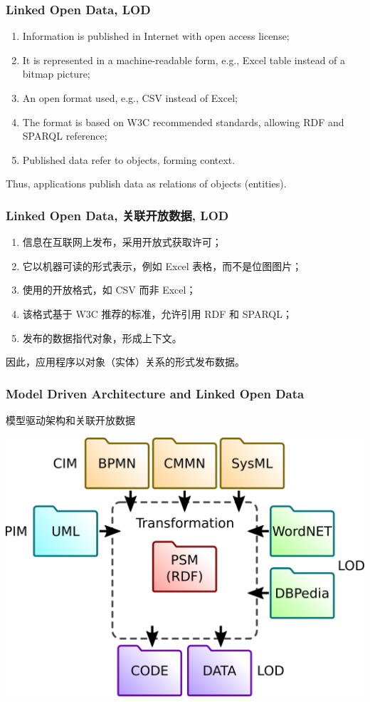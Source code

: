 \documentclass[10pt]{beamer}
\begin{document}
\begin{frame}
  \frametitle{Linked Open Data, LOD}
  \begin{enumerate}
  \item Information is published in Internet with open access license;
  \item It is represented in a machine-readable form, e.g., Excel table instead of a bitmap picture;
  \item An open format used, e.g., CSV instead of Excel;
  \item The format is based on W3C recommended standards, allowing RDF and SPARQL reference;
  \item Published data refer to objects, forming context.
  \end{enumerate}
  Thus, applications publish data as relations of objects (entities).
\end{frame}

\begin{frame}
  \frametitle{Linked Open Data, 关联开放数据, LOD}
  \begin{enumerate}
  \item 信息在互联网上发布，采用开放式获取许可；
  \item 它以机器可读的形式表示，例如 Excel 表格，而不是位图图片；
  \item 使用的开放格式，如 CSV 而非 Excel；
  \item 该格式基于 W3C 推荐的标准，允许引用 RDF 和 SPARQL；
  \item 发布的数据指代对象，形成上下文。
  \end{enumerate}
  因此，应用程序以对象（实体）关系的形式发布数据。
\end{frame}

\begin{frame}
  \frametitle{Model Driven Architecture and Linked Open Data}
  模型驱动架构和关联开放数据
  \begin{center}
    \includegraphics[width=0.9\linewidth]{mda-overview.pdf}
  \end{center}
\end{frame}
\end{document}
